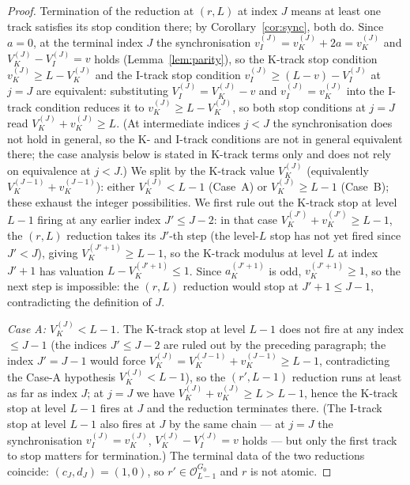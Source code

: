 \documentclass[11pt,reqno]{amsart}
\theoremstyle{plain}
\theoremstyle{definition}
\theoremstyle{remark}
\newcommand{\Obs}{\mathcal{O}}
\newcommand{\Vk}{V_{K}}
\newcommand{\Vi}{V_{I}}
\newcommand{\vk}{v_{K}}
\newcommand{\vi}{v_{I}}
\begin{document}
\begin{proof}
Termination of the reduction at $(r, L)$ at index $J$ means at least one
track satisfies its stop condition there; by Corollary~\ref{cor:sync}, both
do. Since $a = 0$, at the terminal index $J$ the synchronisation
$\vi^{(J)} = \vk^{(J)} + 2a = \vk^{(J)}$ and
$\Vk^{(J)} - \Vi^{(J)} = v$ holds (Lemma~\ref{lem:parity}), so the
K-track stop condition $\vk^{(J)} \ge L - \Vk^{(J)}$ and the I-track stop
condition $\vi^{(J)} \ge (L - v) - \Vi^{(J)}$ at $j = J$ are equivalent:
substituting $\Vi^{(J)} = \Vk^{(J)} - v$ and $\vi^{(J)} = \vk^{(J)}$ into
the I-track condition reduces it to $\vk^{(J)} \ge L - \Vk^{(J)}$, so both
stop conditions at $j = J$ read $\Vk^{(J)} + \vk^{(J)} \ge L$.
(At intermediate indices $j < J$ the synchronisation does not hold in
general, so the K- and I-track conditions are not in general equivalent
there; the case analysis below is stated in K-track terms only and does
not rely on equivalence at $j < J$.)
We split by the K-track value $\Vk^{(J)}$ (equivalently
$\Vk^{(J-1)} + \vk^{(J-1)}$): either $\Vk^{(J)} < L - 1$ (Case~A) or
$\Vk^{(J)} \ge L - 1$ (Case~B); these exhaust the integer possibilities.
We first rule out the K-track stop at level~$L-1$ firing at any earlier
index $J' \le J - 2$: in that case $\Vk^{(J')} + \vk^{(J')} \ge L - 1$,
the $(r, L)$ reduction takes its $J'$-th step (the level-$L$ stop has not
yet fired since $J' < J$), giving $\Vk^{(J'+1)} \ge L - 1$, so the
K-track modulus at level $L$ at index $J'+1$ has valuation
$L - \Vk^{(J'+1)} \le 1$. Since $a_K^{(J'+1)}$ is odd, $\vk^{(J'+1)} \ge 1$,
so the next step is impossible: the $(r, L)$ reduction would stop at
$J' + 1 \le J - 1$, contradicting the definition of $J$.

\emph{Case A: $\Vk^{(J)} < L - 1$.} The K-track stop at level $L - 1$
does not fire at any index $\le J - 1$ (the indices $J' \le J - 2$ are
ruled out by the preceding paragraph; the index $J' = J - 1$ would
force $\Vk^{(J)} = \Vk^{(J-1)} + \vk^{(J-1)} \ge L - 1$, contradicting
the Case-A hypothesis $\Vk^{(J)} < L - 1$), so the $(r', L-1)$ reduction
runs at least as far as index $J$; at $j = J$ we have
$\Vk^{(J)} + \vk^{(J)} \ge L > L - 1$, hence the K-track stop at level
$L - 1$ fires at $J$ and the reduction terminates there. (The I-track
stop at level $L - 1$ also fires at $J$ by the same chain — at $j = J$
the synchronisation $\vi^{(J)} = \vk^{(J)}$, $\Vk^{(J)} - \Vi^{(J)} = v$
holds — but only the first track to stop matters for termination.) The
terminal data of the two reductions coincide: $(c_J, d_J) = (1, 0)$, so
$r' \in \Obs_{L-1}^{G_0}$ and $r$ is not atomic.


\end{proof}
\end{document}
